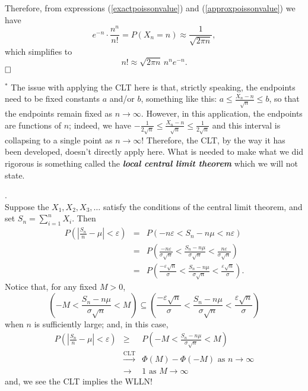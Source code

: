 \documentclass[12pt]{article}
\begin{document}
\medskip

\noindent Therefore, from expressions (\ref{exactpoissonvalue}) and (\ref{approxpoissonvalue}) we have
$$e^{-n}\cdot \frac {n^n}{n!} = P(X_n=n) \approx \frac 1{\sqrt{2\pi n}},$$
which simplifies to
$$n! \approx \sqrt{2\pi n}\,n^ne^{-n}.$$$\hfill\Box$

\noindent $^*$ The issue with applying the CLT here is that, strictly speaking,
the endpoints need to be fixed constants $a$ and/or $b$, something like this: $a\le \frac {X_n-n}{\sqrt{n}} \le b$, so that the endpoints
remain fixed as $n\to \infty$. However, in this application,
the endpoints are functions of $n$; indeed, we have $-\frac 1{2\sqrt{n}}\le \frac {X_n-n}{\sqrt{n}} \le \frac 1{2\sqrt{n}}$ and this interval
is collapsing to a single point as $n\to\infty$!
Therefore, the CLT, by the way it has been developed,
doesn't directly apply here.  What is needed to make what we did rigorous is something called the {\bf\em local central limit theorem}\label{localclt} which we will not state.



\newpage

\label{cltimplieswlln}.\\
Suppose the $X_1,X_2,X_3,\dots$ satisfy the conditions of the central limit theorem, and set $S_n=\sum_{i=1}^n X_i$. Then
\begin{eqnarray*}
    P\left( \left|\frac{S_n}{n} - \mu \right| < \varepsilon \right) &=& P(-n\varepsilon < S_n - n\mu < n\varepsilon) \\
    &=& P\left( \frac{-n\varepsilon}{\sigma\sqrt{n}} < \frac{S_n - n\mu}{\sigma\sqrt{n}} < \frac{n\varepsilon}{\sigma\sqrt{n}}\right) \\
    &=& P\left(\frac{-\varepsilon\sqrt{n}}{\sigma} < \frac{S_n - n\mu}{\sigma\sqrt{n}} < \frac{\varepsilon\sqrt{n}}{\sigma}\right).
\end{eqnarray*}
\noindent Notice that, for any fixed $M > 0$,
$$
\left( -M < \frac{S_n - n\mu}{\sigma\sqrt{n}} < M \right) \subseteq \left( \frac{-\varepsilon\sqrt{n}}{\sigma} < \frac{S_n - n\mu}{\sigma\sqrt{n}} < \frac{\varepsilon\sqrt{n}}{\sigma} \right)
$$
when $n$ is sufficiently large; and, in this case,
\begin{eqnarray*}
    P\left( \left| \frac{S_n}{n} - \mu \right| < \varepsilon \right) &\geq& P\left( -M < \frac{S_n - n\mu}{\sigma\sqrt{n}} < M\right) \\
    & \xrightarrow{\text{CLT}}& \Phi(M) - \Phi(-M) \text{ as } n \to \infty \\
    & \rightarrow& 1 \text{ as } M \to \infty
\end{eqnarray*}
and, we see the CLT implies the WLLN!\\
\end{document}
